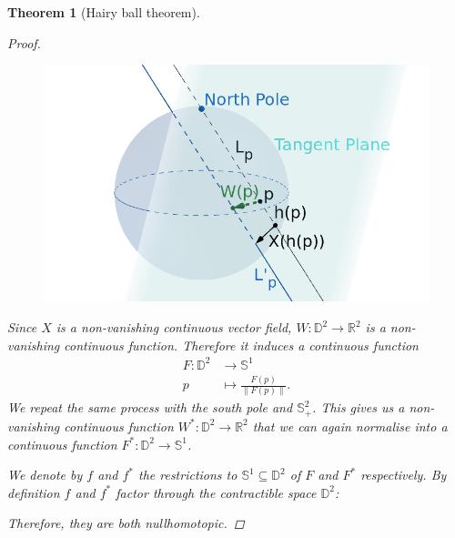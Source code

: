 \documentclass[A4paper, 12pt, british, reqno]{amsart}
\newcommand{\bbD}{\mathbb{D}}
\newcommand{\R}{\mathbb{R}} %
\newcommand{\bbS}{\mathbb{S}}
\theoremstyle{plain}
\newtheorem{thm}{Theorem}[section]
\theoremstyle{definition}
\theoremstyle{remark}
\theoremstyle{plain}
\theoremstyle{definition}
\theoremstyle{remark}
\theoremstyle{plain}
\theoremstyle{definition}
\theoremstyle{remark}
\begin{document}
\begin{thm}[Hairy ball theorem]
\begin{proof}
	\begin{figure}[htp]
	    \centering
	    \includegraphics[scale=.4]{HairyBallW.png}
	\end{figure}

	Since $X$ is a non-vanishing continuous vector field, $W\colon \bbD^{2}\to \R^{2}$ is a non-vanishing continuous function.
	Therefore it induces a continuous function
	\begin{align*}
	    F\colon \bbD^{2} &\longrightarrow \bbS^{1} \\
	    p &\longmapsto \frac{F(p)}{\lVert F(p)\rVert}.
	\end{align*}
	We repeat the same process with the south pole and $\bbS^{2}_{+}$.
	This gives us a non-vanishing continuous function $W^{*}\colon \bbD^{2}\to \R^{2}$ that we can again normalise into a continuous function $F^{*}\colon \bbD^{2}\to \bbS^{1}$.

	We denote by $f$ and $f^{*}$ the restrictions to $\bbS^{1}\subseteq \bbD^{2}$ of $F$ and $F^{*}$ respectively.
	By definition $f$ and $f^{*}$ factor through the contractible space $\bbD^{2}$:
	\begin{center}
	\end{center}
	Therefore, they are both nullhomotopic.


\end{proof}
\end{thm}
\end{document}
